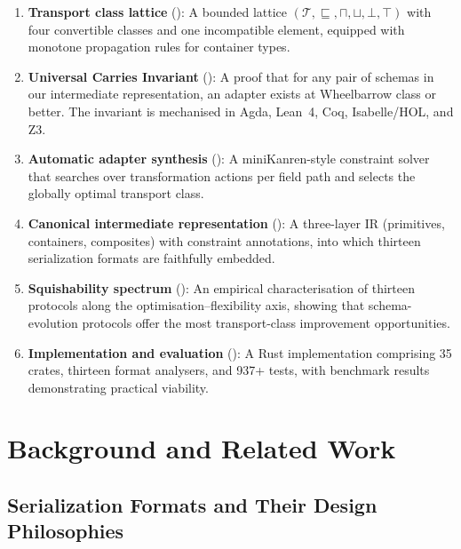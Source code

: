 \documentclass[11pt,a4paper]{article}
\theoremstyle{definition}
\theoremstyle{remark}
\newcommand{\TC}{\mathcal{T}}                    %
\begin{document}
\begin{enumerate}[leftmargin=*]
  \item \textbf{Transport class lattice} (): A
    bounded lattice $(\TC, \sqsubseteq, \sqcap, \sqcup, \bot, \top)$
    with four convertible classes and one incompatible element,
    equipped with monotone propagation rules for container types.

  \item \textbf{Universal Carries Invariant} (): A
    proof that for any pair of schemas in our intermediate
    representation, an adapter exists at Wheelbarrow class or better.
    The invariant is mechanised in Agda, Lean~4, Coq, Isabelle/HOL,
    and Z3.

  \item \textbf{Automatic adapter synthesis} (): A
    miniKanren-style constraint solver that searches over
    transformation actions per field path and selects the globally
    optimal transport class.

  \item \textbf{Canonical intermediate representation}
    (): A three-layer IR (primitives, containers,
    composites) with constraint annotations, into which thirteen
    serialization formats are faithfully embedded.

  \item \textbf{Squishability spectrum} (): An
    empirical characterisation of thirteen protocols along the
    optimisation--flexibility axis, showing that schema-evolution
    protocols offer the most transport-class improvement opportunities.

  \item \textbf{Implementation and evaluation}
    (): A Rust implementation
    comprising 35 crates, thirteen format analysers, and 937+ tests,
    with benchmark results demonstrating practical viability.
\end{enumerate}

\section{Background and Related Work}\label{sec:related}

\subsection{Serialization Formats and Their Design Philosophies}
\end{document}
